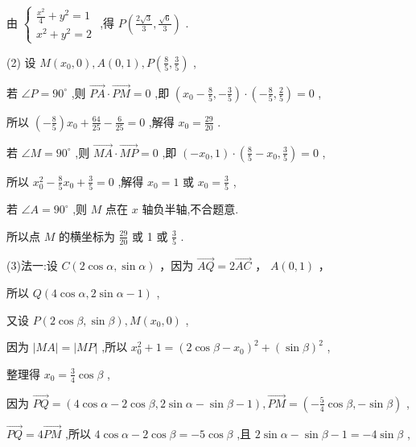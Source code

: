 \documentclass[10pt]{article}
\begin{document}
由 \(\left\{  \begin{array}{l} \frac{{x}^{2}}{4} + {y}^{2} = 1 \\  {x}^{2} + {y}^{2} = 2 \end{array}\right.\) ,得 \(P\left( {\frac{2\sqrt{3}}{3},\frac{\sqrt{6}}{3}}\right)\) .

(2) 设 \(M\left( {{x}_{0},0}\right) ,A\left( {0,1}\right) ,P\left( {\frac{8}{5},\frac{3}{5}}\right)\) ,

若 \(\angle P = {90}^{ \circ  }\) ,则 \(\overrightarrow{PA} \cdot  \overrightarrow{PM} = 0\) ,即 \(\left( {{x}_{0} - \frac{8}{5}, - \frac{3}{5}}\right)  \cdot  \left( {-\frac{8}{5},\frac{2}{5}}\right)  = 0\) ,

所以 \(\left( {-\frac{8}{5}}\right) {x}_{0} + \frac{64}{25} - \frac{6}{25} = 0\) ,解得 \({x}_{0} = \frac{29}{20}\) .

若 \(\angle M = {90}^{ \circ  }\) ,则 \(\overrightarrow{MA} \cdot  \overrightarrow{MP} = 0\) ,即 \(\left( {-{x}_{0},1}\right)  \cdot  \left( {\frac{8}{5} - {x}_{0},\frac{3}{5}}\right)  = 0\) ,

所以 \({x}_{0}^{2} - \frac{8}{5}{x}_{0} + \frac{3}{5} = 0\) ,解得 \({x}_{0} = 1\) 或 \({x}_{0} = \frac{3}{5}\) ,

若 \(\angle A = {90}^{ \circ  }\) ,则 \(M\) 点在 \(x\) 轴负半轴,不合题意.

所以点 \(M\) 的横坐标为 \(\frac{29}{20}\) 或 1 或 \(\frac{3}{5}\) .

(3)法一:设 \(C\left( {2\cos \alpha ,\sin \alpha }\right)\) ，因为 \(\overrightarrow{AQ} = 2\overrightarrow{AC}\) ， \(A\left( {0,1}\right)\) ，

所以 \(Q\left( {4\cos \alpha ,2\sin \alpha  - 1}\right)\) ,

又设 \(P\left( {2\cos \beta ,\sin \beta }\right) ,M\left( {{x}_{0},0}\right)\) ,

因为 \(\left| {MA}\right|  = \left| {MP}\right|\) ,所以 \({x}_{0}^{2} + 1 = {\left( 2\cos \beta  - {x}_{0}\right) }^{2} + {\left( \sin \beta \right) }^{2}\) ,

整理得 \({x}_{0} = \frac{3}{4}\cos \beta\) ,

因为 \(\overrightarrow{PQ} = \left( {4\cos \alpha  - 2\cos \beta ,2\sin \alpha  - \sin \beta  - 1}\right) ,\overrightarrow{PM} = \left( {-\frac{5}{4}\cos \beta , - \sin \beta }\right)\) ,

\(\overrightarrow{PQ} = 4\overrightarrow{PM}\) ,所以 \(4\cos \alpha  - 2\cos \beta  =  - 5\cos \beta\) ,且 \(2\sin \alpha  - \sin \beta  - 1 =  - 4\sin \beta\) ,
\end{document}
